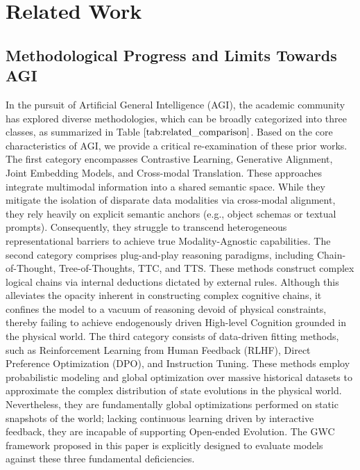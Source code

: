 


\section{Related Work}
\label{sec:related}

\subsection{Methodological Progress and Limits Towards AGI}
In the pursuit of Artificial General Intelligence (AGI), the academic community has explored diverse methodologies, which can be broadly categorized into three classes, as summarized in Table $\ref{tab:related_comparison}$. Based on the core characteristics of AGI, we provide a critical re-examination of these prior works. The first category encompasses Contrastive Learning, Generative Alignment, Joint Embedding Models, and Cross-modal Translation. These approaches integrate multimodal information into a shared semantic space. While they mitigate the isolation of disparate data modalities via cross-modal alignment, they rely heavily on explicit semantic anchors (e.g., object schemas or textual prompts). Consequently, they struggle to transcend heterogeneous representational barriers to achieve true Modality-Agnostic capabilities. The second category comprises plug-and-play reasoning paradigms, including Chain-of-Thought, Tree-of-Thoughts, TTC, and TTS. These methods construct complex logical chains via internal deductions dictated by external rules. Although this alleviates the opacity inherent in constructing complex cognitive chains, it confines the model to a vacuum of reasoning devoid of physical constraints, thereby failing to achieve endogenously driven High-level Cognition grounded in the physical world. The third category consists of data-driven fitting methods, such as Reinforcement Learning from Human Feedback (RLHF), Direct Preference Optimization (DPO), and Instruction Tuning. These methods employ probabilistic modeling and global optimization over massive historical datasets to approximate the complex distribution of state evolutions in the physical world. Nevertheless, they are fundamentally global optimizations performed on static snapshots of the world; lacking continuous learning driven by interactive feedback, they are incapable of supporting Open-ended Evolution. The GWC framework proposed in this paper is explicitly designed to evaluate models against these three fundamental deficiencies.
